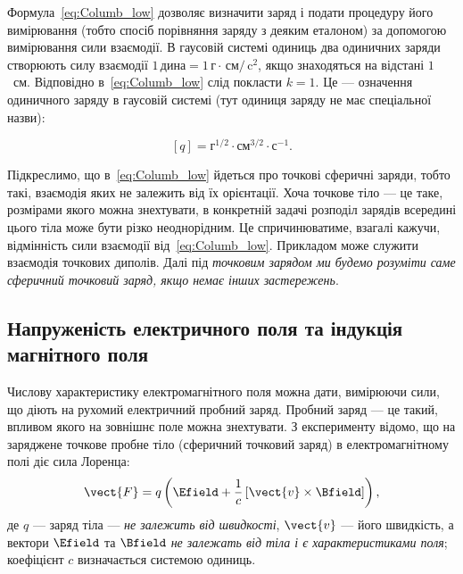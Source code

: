 Формула~\eqref{eq:Columb_low} дозволяє визначити заряд і подати процедуру його вимірювання (тобто спосіб порівняння
заряду з деяким еталоном) за допомогою вимірювання сили взаємодії. В гаусовій системі одиниць два одиничних заряди створюють силу взаємодії $1\, \text{дина} = 1\, \text{г}\cdot\,\text{см} /\, \text{c}^2$,
якщо знаходяться на відстані $1$~см. Відповідно в~\eqref{eq:Columb_low} слід покласти $k=1$. Це --- означення одиничного
заряду в гаусовій системі (тут одиниця заряду не має спеціальної назви):

\begin{equation*}
	\left[q\right] = \text{г}^{1/2}\cdot\text{см}^{3/2}\cdot\text{с}^{-1}.
\end{equation*}

Підкреслимо, що в~\eqref{eq:Columb_low} йдеться про точкові сферичні заряди, тобто такі, взаємодія яких не залежить від
їх орієнтації. Хоча точкове тіло --- це таке, розмірами якого можна знехтувати, в конкретній задачі розподіл зарядів
всередині цього тіла може бути різко неоднорідним. Це спричинюватиме, взагалі кажучи, відмінність сили взаємодії
від~\eqref{eq:Columb_low}. Прикладом може служити взаємодія точкових диполів. Далі під \emph{точковим зарядом ми будемо
розуміти саме сферичний точковий заряд, якщо немає інших застережень}.

\subsection*{Напруженість електричного поля та індукція магнітного поля}

Числову характеристику електромагнітного поля можна дати, вимірюючи сили, що діють на рухомий електричний пробний
заряд. Пробний заряд --- це такий, впливом якого на зовнішнє поле можна знехтувати. З експерименту
відомо, що на заряджене точкове пробне тіло (сферичний точковий заряд) в електромагнітному полі діє сила
Лоренца:
\begin{equation}\label{eq:Lorentz_force}
	\vect{F} = q\left( \Efield + \frac1c \left[ \vect{v}\times\Bfield\right] \right),
\end{equation}
де $q$ --- заряд тіла --- \emph{не залежить від швидкості}, $\vect{v}$ --- його швидкість, а вектори $\Efield$ та
$\Bfield$ \emph{не залежать від тіла і є характеристиками поля}; коефіцієнт $c$ визначається системою одиниць.

